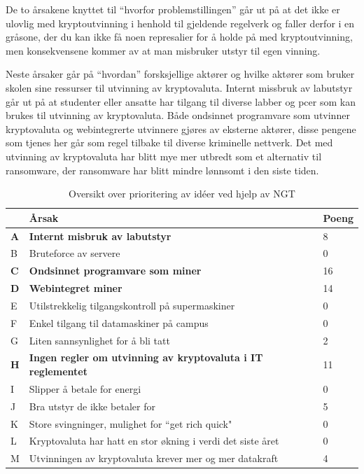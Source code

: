 De to årsakene knyttet til ``hvorfor problemstillingen'' går ut på at det ikke er ulovlig med kryptoutvinning i henhold til gjeldende regelverk og faller derfor i en gråsone, der du kan ikke få noen represalier for å holde på med kryptoutvinning, men konsekvensene kommer av at man misbruker utstyr til egen vinning.

Neste årsaker går på ``hvordan'' forsksjellige aktører og hvilke aktører som bruker skolen sine ressurser til utvinning av kryptovaluta. Internt missbruk av labutstyr går ut på at studenter eller ansatte har tilgang til diverse labber og pcer som kan brukes til utvinning av kryptovaluta. Både ondsinnet programvare som utvinner kryptovaluta og webintegrerte utvinnere gjøres av eksterne aktører, disse pengene som tjenes her går som regel tilbake til diverse kriminelle nettverk. Det med utvinning av kryptovaluta har blitt mye mer utbredt som et alternativ til ransomware, der ransomware har blitt mindre lønnsomt i den siste tiden.








\begin{table} [H]
    \begin{tabular}{ | m{2em} | m{30em} | m{3em} | }
        \hline
            \cellcolor{yellow}  & \cellcolor{yellow} Årsak & \cellcolor{yellow} Poeng \\
        \hline
           \textbf{A}&\textbf{Internt misbruk av labutstyr} & 8  \\
        \hline
          B & Bruteforce av servere & 0 \\
        \hline
          \textbf{C} & \textbf{Ondsinnet programvare som miner} &  16 \\
        \hline
         \textbf{D} & \textbf{Webintegret miner} & 14 \\
        \hline
          E & Utilstrekkelig tilgangskontroll på supermaskiner & 0 \\
        \hline
          F & Enkel tilgang til datamaskiner på campus & 0 \\
        \hline
         G & Liten sannsynlighet for å bli tatt & 2 \\
        \hline
         \textbf{H} & \textbf{Ingen regler om utvinning av kryptovaluta i IT reglementet} & 11 \\
        \hline
         I & Slipper å betale for energi & 0 \\
        \hline
         J & Bra utstyr de ikke betaler for & 5 \\
        \hline
         K & Store svingninger, mulighet for “get rich quick" & 0 \\
        \hline
         L & Kryptovaluta har hatt en stor økning i verdi det siste året & 0 \\
        \hline
         M & Utvinningen av kryptovaluta krever mer og mer datakraft & 4 \\
        \hline
    \end{tabular}
    \caption{Oversikt over prioritering av idéer ved hjelp av NGT}
    \label{NGT}
\end{table}



